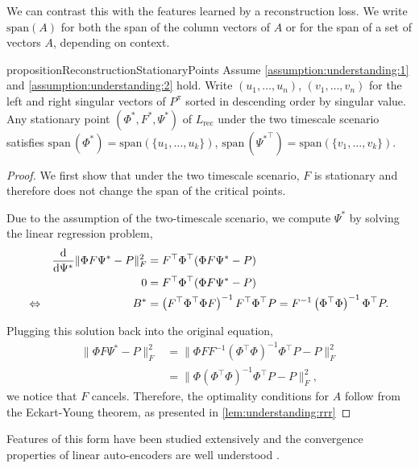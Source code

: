 We can contrast this with the features learned by a reconstruction loss.
We write $\mathrm{span}(A)$ for both the span of the column vectors of $A$ or for the span of a set of vectors $A$, depending on context.
\begin{restatable}{proposition}{ReconstructionStationaryPoints}\label{prop:understanding:2}
Assume \autoref{assumption:understanding:1} and \autoref{assumption:understanding:2} hold. Write $(u_1,\dots,u_n)$, $(v_1,\dots,v_n)$ for the left and right singular vectors of $P^\pi$ sorted in descending order by singular value. Any stationary point $(\Phi^*, F^*, \Psi^*)$ of $L_\text{rec}$ under the two timescale scenario satisfies $\mathrm{span}\,(\Phi^*)=\mathrm{span}\left(\{u_1,\dots,u_k\}\right)$, $\mathrm{span}\,({\Psi^*}^\top)=\mathrm{span}\left(\{v_1,\dots,v_k\}\right)$.
\end{restatable}
\begin{proof}
We first show that under the two timescale scenario, $F$ is stationary and therefore does not change the span of the critical points.

Due to the assumption of the two-timescale scenario, we compute $\Psi^*$ by solving the linear regression problem,
\begin{align*}
    &&\frac{\mathrm{d}}{\mathrm{d} \Psi^*} \lVert \Phi F\Psi^* - P \rVert_F^2 &= F^\top {\Phi}^\top ({\Phi}F\Psi^* - P)\\
    &&0 &=  F^\top {\Phi}^\top ({\Phi}F\Psi^* - P)\\
    \Leftrightarrow && B^* &= \left(F^\top {\Phi}^\top {\Phi}F\right)^{-1} F^\top \Phi^\top P = F^{-1}\left(\Phi^\top \Phi\right)^{-1} \Phi^\top P.
\end{align*}

Plugging this solution back into the original equation, 
\begin{align}
    \lVert \Phi F\Psi^* - P \rVert_F^2 &= \lVert \Phi FF^{-1}\left(\Phi^\top \Phi\right)^{-1} \Phi^\top P - P \rVert_F^2\\
    &= \lVert \Phi \left(\Phi^\top \Phi\right)^{-1} \Phi^\top P - P \rVert_F^2,
\end{align}
we notice that $F$ cancels.
Therefore, the optimality conditions for $A$ follow from the Eckart-Young theorem, as presented in \autoref{lem:understanding:rrr}
\end{proof}


Features of this form have been studied extensively and the convergence properties of linear auto-encoders are well understood \parencite{baldi1989neural,pretorius2018learning,bao2020regularized}.

